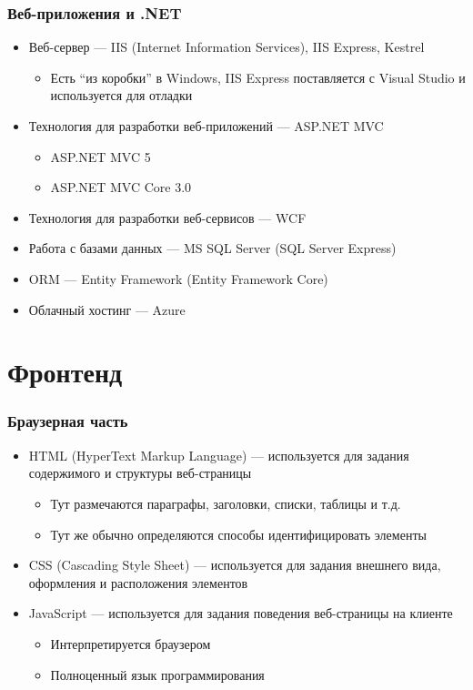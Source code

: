 \documentclass[xetex,mathserif,serif]{beamer}
\begin{document}
	\begin{frame}
		\frametitle{Веб-приложения и .NET}
		\begin{itemize}
			\item Веб-сервер --- IIS (Internet Information Services), IIS Express, Kestrel
			\begin{itemize}
				\item Есть ``из коробки'' в Windows, IIS Express поставляется с Visual Studio и используется для отладки
			\end{itemize}
			\item Технология для разработки веб-приложений --- ASP.NET MVC
			\begin{itemize}
				\item ASP.NET MVC 5
				\item ASP.NET MVC Core 3.0
			\end{itemize}
			\item Технология для разработки веб-сервисов --- WCF
			\item Работа с базами данных --- MS SQL Server (SQL Server Express)
			\item ORM --- Entity Framework (Entity Framework Core)
			\item Облачный хостинг --- Azure
		\end{itemize}
	\end{frame}

	\section{Фронтенд}

	\begin{frame}
		\frametitle{Браузерная часть}
		\begin{itemize}
			\item HTML (HyperText Markup Language) --- используется для задания содержимого и структуры веб-страницы
			\begin{itemize}
				\item Тут размечаются параграфы, заголовки, списки, таблицы и т.д.
				\item Тут же обычно определяются способы идентифицировать элементы
			\end{itemize}
			\item CSS (Cascading Style Sheet) --- используется для задания внешнего вида, оформления и расположения элементов
			\item JavaScript --- используется для задания поведения веб-страницы на клиенте
			\begin{itemize}
				\item Интерпретируется браузером
				\item Полноценный язык программирования
			\end{itemize}
		\end{itemize}
	\end{frame}
\end{document}
